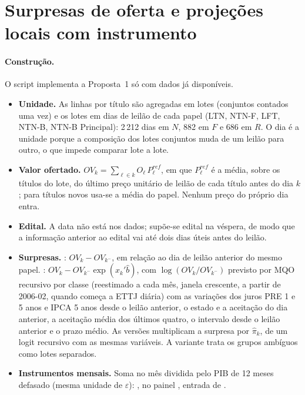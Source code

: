 \documentclass[12pt,a4paper]{article}
\begin{document}
\section{Surpresas de oferta e projeções locais com instrumento}\label{sec:prop1}

\paragraph{Construção.} O script  implementa a
Proposta~1 só com dados já disponíveis.
\begin{itemize}[leftmargin=1.2cm]
    \item \textbf{Unidade.} As linhas por título são agregadas em lotes (conjuntos
    contados uma vez) e os lotes em dias de leilão de cada papel (LTN, NTN-F, LFT,
    NTN-B, NTN-B Principal): 2\,212 dias em \(N\), 882 em \(F\) e 686 em \(R\). O dia
    é a unidade porque a composição dos lotes conjuntos muda de um leilão para
    outro, o que impede comparar lote a lote.
    \item \textbf{Valor ofertado.} \(OV_k=\sum_{\ell\in k}O_\ell\,P^{ref}_\ell\), em que
    \(P^{ref}_\ell\) é a média, sobre os títulos do lote, do último preço unitário de
    leilão de cada título antes do dia \(k\); para títulos novos usa-se a média do
    papel. Nenhum preço do próprio dia entra.
    \item \textbf{Edital.} A data não está nos dados; supõe-se edital na véspera, de
    modo que a informação anterior ao edital vai até dois dias úteis antes do leilão.
    \item \textbf{Surpresas.} : \(OV_k-OV_{k^-}\), em relação ao dia de
    leilão anterior do mesmo papel. : \(OV_k-OV_{k^-}\exp(x_k'\hat b)\),
    com \(\log(OV_k/OV_{k^-})\) previsto por MQO recursivo por classe (reestimado
    a cada mês, janela crescente, a partir de 2006-02, quando começa a ETTJ diária)
    com as variações dos juros PRE 1 e 5 anos e IPCA 5 anos desde o leilão anterior,
    o estado e a aceitação do dia anterior, a aceitação média dos últimos quatro, o
    intervalo desde o leilão anterior e o prazo médio. As versões 
    multiplicam a surpresa por \(\hat\pi_k\), de um logit recursivo com as mesmas
    variáveis. A variante  trata os grupos ambíguos como lotes
    separados.
    \item \textbf{Instrumentos mensais.} Soma no mês dividida pelo PIB de 12 meses
    defasado (mesma unidade de \(\varepsilon\)): 
    , no painel
    , entrada de
    .
\end{itemize}
\end{document}
